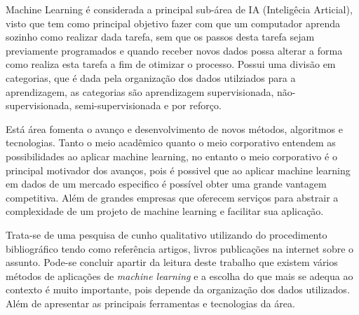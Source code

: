 Machine Learning é considerada a principal sub-área de IA (Inteligêcia Articial), visto que tem como principal objetivo fazer com 
que um computador aprenda sozinho como realizar dada tarefa, sem que os passos desta tarefa sejam previamente programados e
quando receber novos dados possa alterar a forma como realiza esta tarefa a fim de otimizar o processo. Possui uma divisão
em categorias, que é dada pela organização dos dados utilziados para a aprendizagem, as categorias são aprendizagem supervisionada, não-supervisionada, 
semi-supervisionada e por reforço.   


Está área fomenta o avanço e desenvolvimento de novos métodos, algoritmos e tecnologias. Tanto o meio acadêmico quanto o meio 
corporativo entendem as possibilidades ao aplicar machine learning, no entanto o meio corporativo é o principal motivador 
dos avanços, pois é possivel que ao aplicar machine learning em dados de um mercado especifico é possível obter uma grande
vantagem competitiva. Além de grandes empresas que oferecem serviços para abstrair a complexidade de um projeto de 
machine learning e facilitar sua aplicação. 

Trata-se de uma pesquisa de cunho qualitativo utilizando do procedimento
bibliográfico tendo como referência artigos, livros publicações na internet sobre o assunto. Pode-se concluir apartir da 
leitura deste trabalho que existem vários métodos de aplicações de \textit{machine learning} e a escolha do que mais 
se adequa ao contexto é muito importante, pois depende da organização dos dados utilizados. 
Além de apresentar as principais ferramentas e tecnologias da área.   



